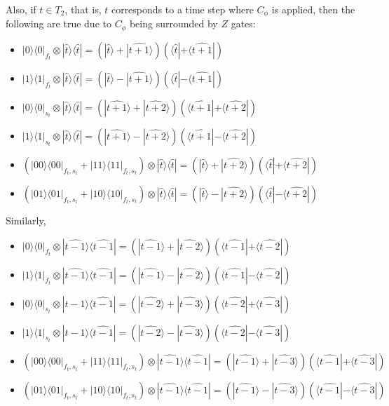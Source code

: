 \documentclass{article}
\theoremstyle{definition}
\begin{document}
Also, if $t\in T_2$, that is, $t$ corresponds to a time step where $C_\phi$ is applied, then the following are true due to $C_\phi$ being surrounded by $Z$ gates:
\begin{itemize}
	\item $|0\rangle\langle0|_{f_t}\otimes
		|\widehat{t}\rangle\langle\widehat{t}|
		=(|\widehat{t}\rangle+|\widehat{t+1}\rangle)
		(\langle\widehat{t}|+\langle\widehat{t+1}|)$
	\item $|1\rangle\langle1|_{f_t}\otimes
		|\widehat{t}\rangle\langle\widehat{t}|
		=(|\widehat{t}\rangle-|\widehat{t+1}\rangle)
		(\langle\widehat{t}|-\langle\widehat{t+1}|)$
	\item $|0\rangle\langle0|_{s_t}\otimes
		|\widehat{t}\rangle\langle\widehat{t}|
		=(|\widehat{t+1}\rangle+|\widehat{t+2}\rangle)
		(\langle\widehat{t+1}|+\langle\widehat{t+2}|)$
	\item $|1\rangle\langle1|_{s_t}\otimes
		|\widehat{t}\rangle\langle\widehat{t}|
		=(|\widehat{t+1}\rangle-|\widehat{t+2}\rangle)
		(\langle\widehat{t+1}|-\langle\widehat{t+2}|)$
	\item $(|00\rangle\langle00|_{f_t,s_t}
		+|11\rangle\langle11|_{f_t,s_t})\otimes
		|\widehat{t}\rangle\langle\widehat{t}|
		=(|\widehat{t}\rangle+|\widehat{t+2}\rangle)
		(\langle\widehat{t}|+\langle\widehat{t+2}|)$
	\item $(|01\rangle\langle01|_{f_t,s_t}
		+|10\rangle\langle10|_{f_t,s_t})\otimes
		|\widehat{t}\rangle\langle\widehat{t}|
		=(|\widehat{t}\rangle-|\widehat{t+2}\rangle)
		(\langle\widehat{t}|-\langle\widehat{t+2}|)$
\end{itemize}

Similarly,
\begin{itemize}
	\item $|0\rangle\langle0|_{f_t}\otimes
		|\widehat{t-1}\rangle\langle\widehat{t-1}|
		=(|\widehat{t-1}\rangle+|\widehat{t-2}\rangle)
		(\langle\widehat{t-1}|+\langle\widehat{t-2}|)$
	\item $|1\rangle\langle1|_{f_t}\otimes
		|\widehat{t-1}\rangle\langle\widehat{t-1}|
		=(|\widehat{t-1}\rangle-|\widehat{t-2}\rangle)
		(\langle\widehat{t-1}|-\langle\widehat{t-2}|)$
	\item $|0\rangle\langle0|_{s_t}\otimes
		|\widehat{t-1}\rangle\langle\widehat{t-1}|
		=(|\widehat{t-2}\rangle+|\widehat{t-3}\rangle)
		(\langle\widehat{t-2}|+\langle\widehat{t-3}|)$
	\item $|1\rangle\langle1|_{s_t}\otimes
		|\widehat{t-1}\rangle\langle\widehat{t-1}|
		=(|\widehat{t-2}\rangle-|\widehat{t-3}\rangle)
		(\langle\widehat{t-2}|-\langle\widehat{t-3}|)$
	\item $(|00\rangle\langle00|_{f_t,s_t}
		+|11\rangle\langle11|_{f_t,s_t})\otimes
		|\widehat{t-1}\rangle\langle\widehat{t-1}|
		=(|\widehat{t-1}\rangle+|\widehat{t-3}\rangle)
		(\langle\widehat{t-1}|+\langle\widehat{t-3}|)$
	\item $(|01\rangle\langle01|_{f_t,s_t}
		+|10\rangle\langle10|_{f_t,s_t})\otimes
		|\widehat{t-1}\rangle\langle\widehat{t-1}|
		=(|\widehat{t-1}\rangle-|\widehat{t-3}\rangle)
		(\langle\widehat{t-1}|-\langle\widehat{t-3}|)$
\end{itemize}
\end{document}
